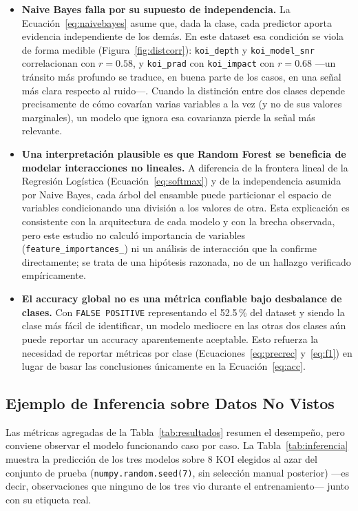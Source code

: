 \documentclass[10pt,journal]{IEEEtran}
\begin{document}
  \begin{itemize}
    \item \textbf{Naive Bayes falla por su supuesto de independencia.} La Ecuaci\'on~\ref{eq:naivebayes} asume que, dada la clase, cada predictor aporta evidencia independiente de los dem\'as. En este dataset esa condici\'on se viola de forma medible (Figura~\ref{fig:distcorr}): \texttt{koi\_depth} y \texttt{koi\_model\_snr} correlacionan con $r=0.58$, y \texttt{koi\_prad} con \texttt{koi\_impact} con $r=0.68$ —un tr\'ansito m\'as profundo se traduce, en buena parte de los casos, en una se\~nal m\'as clara respecto al ruido—. Cuando la distinci\'on entre dos clases depende precisamente de c\'omo covar\'ian varias variables a la vez (y no de sus valores marginales), un modelo que ignora esa covarianza pierde la se\~nal m\'as relevante.
    \item \textbf{Una interpretaci\'on plausible es que Random Forest se beneficia de modelar interacciones no lineales.} A diferencia de la frontera lineal de la Regresi\'on Log\'istica (Ecuaci\'on~\ref{eq:softmax}) y de la independencia asumida por Naive Bayes, cada \'arbol del ensamble puede particionar el espacio de variables condicionando una divisi\'on a los valores de otra. Esta explicaci\'on es consistente con la arquitectura de cada modelo y con la brecha observada, pero este estudio no calcul\'o impor\-tancia de variables (\texttt{feature\_importances\_}) ni un an\'alisis de interacci\'on que la confirme directamente; se trata de una hip\'otesis razonada, no de un hallazgo verificado emp\'iricamente.
    \item \textbf{El accuracy global no es una m\'etrica confiable bajo desbalance de clases.} Con \texttt{FALSE POSITIVE} representando el 52.5\,\% del dataset y siendo la clase m\'as f\'acil de identificar, un modelo mediocre en las otras dos clases a\'un puede reportar un accuracy aparentemente aceptable. Esto refuerza la necesidad de reportar m\'etricas por clase (Ecuaciones~\ref{eq:precrec} y~\ref{eq:f1}) en lugar de basar las conclusiones \'unicamente en la Ecuaci\'on~\ref{eq:acc}.
  \end{itemize}

  \subsection{Ejemplo de Inferencia sobre Datos No Vistos}

  Las m\'etricas agregadas de la Tabla~\ref{tab:resultados} resumen el desempe\~no, pero conviene observar el modelo funcionando caso por caso. La Tabla~\ref{tab:inferencia} muestra la predicci\'on de los tres modelos sobre 8 KOI elegidos al azar del conjunto de prueba (\texttt{numpy.random.seed(7)}, sin selecci\'on manual posterior) —es decir, observaciones que ninguno de los tres vio durante el entrenamiento— junto con su etiqueta real.
\end{document}
